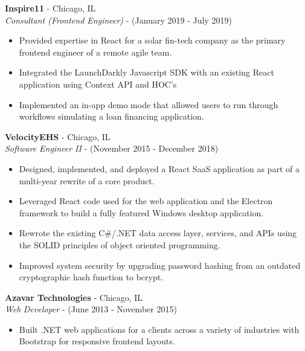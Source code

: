 \documentclass[12pt]{article}
\begin{document}
\begin{paracol}{2}
\noindent \textbf{Inspire11} - Chicago, IL \\
\textit{Consultant (Frontend Engineer)} - {\footnotesize{(January 2019 - July 2019)}} 
\begin{itemize}[leftmargin=*]
    \setlength\itemsep{0em}
    \item{\footnotesize{Provided expertise in React for a solar fin-tech company as the primary frontend engineer of a remote agile team.}}
    \item {\footnotesize{Integrated the LaunchDarkly Javascript SDK with an existing React application using Context API and HOC's}}
    \item {\footnotesize{Implemented an in-app demo mode that allowed users to run through workflows simulating a loan financing application.}}
\end{itemize} 

\noindent \textbf{VelocityEHS} - Chicago, IL \\
\textit{Software Engineer II} - {\footnotesize{(November 2015 - December 2018)}}
\begin{itemize}[leftmargin=*]
    \setlength\itemsep{0em}
    \item {\footnotesize{Designed, implemented, and deployed a React SaaS application as part of a multi-year rewrite of a core product.}}
    \item {\footnotesize{Leveraged React code used for the web application and the Electron framework to build a fully featured Windows desktop application.}}
    \item {\footnotesize{Rewrote the existing C\#/.NET data access layer, services, and APIs using the SOLID principles of object oriented programming.}}
    \item {\footnotesize{Improved system security by upgrading password hashing from an outdated cryptographic hash function to bcrypt.}}
\end{itemize} 

\noindent \textbf{Azavar Technologies} - Chicago, IL \\
\textit{Web Developer} - {\footnotesize(June 2013 - November 2015)}
\begin{itemize}[leftmargin=*]
    \setlength\itemsep{0em}
    \item {\footnotesize{Built .NET web applications for a clients across a variety of industries with Bootstrap for responsive frontend layouts.}} 
\end{itemize}
    
\end{paracol}
\end{document}
